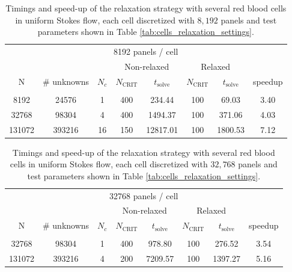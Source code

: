 \documentclass[final,3p,times]{elsarticle}
\newcommand{\ncrit}{N_{\text{CRIT}}}
\newcommand{\tsolve}{t_{\text{solve}}}
\begin{document}
\begin{table}[htp]
\footnotesize
\begin{center}
\begin{tabular}{c|c|c|cc|cc|c}
\multicolumn{8}{c}{8192 panels / cell} \\
& & &  \multicolumn{2}{c}{Non-relaxed} & \multicolumn{2}{c}{Relaxed}\\
N & \# unknowns & $N_c$ & $\ncrit$ & $\tsolve$ & $\ncrit$ & $\tsolve$ & speedup \\ \hline
& & & & & & &  \\
8192 & 24576 & 1 & 400 & 234.44 & 100 & 69.03 & 3.40 \\ 
32768 & 98304 & 4 & 400 & 1494.37 & 100 & 371.06 & 4.03 \\
131072 & 393216 & 16 & 150 & 12817.01\footnotemark[1] & 100 & 1800.53 & 7.12\footnotemark[1] \\
\end{tabular}
\end{center}
\caption{Timings and speed-up of the relaxation strategy with several red blood cells in uniform Stokes flow, each cell discretized with $8,192$ panels and test parameters shown in Table \ref{tab:cells_relaxation_settings}.}
\label{tab:multiple_cell_relaxation_results_8192}
\end{table}


\begin{table}[htp]
\footnotesize
\begin{center}
\begin{tabular}{c|c|c|cc|cc|c}
\multicolumn{8}{c}{32768 panels / cell} \\
& & & \multicolumn{2}{c}{Non-relaxed} & \multicolumn{2}{c}{Relaxed}\\
N & \# unknowns & $N_c$ & $\ncrit$ & $\tsolve$ & $\ncrit$ & $\tsolve$ & speedup \\ \hline
& & & & & & &  \\
32768 & 98304 & 1 & 400 & 978.80 & 100 & 276.52 & 3.54 \\
131072 & 393216 & 4 & 200 & 7209.57\footnotemark[1] & 100 & 1397.27 & 5.16\footnotemark[1] \\	
\end{tabular}
\end{center}
\caption{Timings and speed-up of the relaxation strategy with several red blood cells in uniform Stokes flow, each cell discretized with $32,768$ panels and test parameters shown in Table \ref{tab:cells_relaxation_settings}.}
\label{tab:multiple_cell_relaxation_results_32768}
\end{table}
\end{document}
